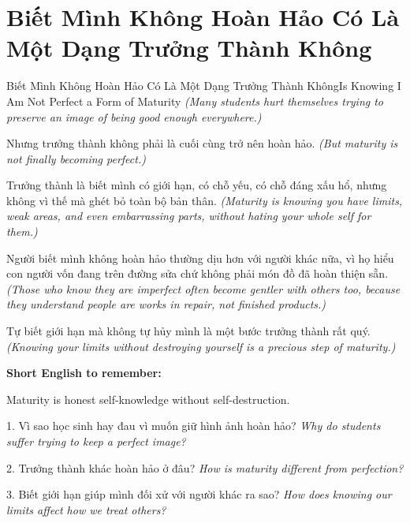 \section{Biết Mình Không Hoàn Hảo Có Là Một Dạng Trưởng Thành Không}
\begin{truyen}{Biết Mình Không Hoàn Hảo Có Là Một Dạng Trưởng Thành Không}{Is Knowing I Am Not Perfect a Form of Maturity}
\textit{(Many students hurt themselves trying to preserve an image of being good enough everywhere.)}

Nhưng trưởng thành không phải là cuối cùng trở nên hoàn hảo.
\textit{(But maturity is not finally becoming perfect.)}

Trưởng thành là biết mình có giới hạn, có chỗ yếu, có chỗ đáng xấu hổ, nhưng không vì thế mà ghét bỏ toàn bộ bản thân.
\textit{(Maturity is knowing you have limits, weak areas, and even embarrassing parts, without hating your whole self for them.)}

Người biết mình không hoàn hảo thường dịu hơn với người khác nữa, vì họ hiểu con người vốn đang trên đường sửa chứ không phải món đồ đã hoàn thiện sẵn.
\textit{(Those who know they are imperfect often become gentler with others too, because they understand people are works in repair, not finished products.)}
\end{truyen}

\begin{baihoc}
Tự biết giới hạn mà không tự hủy mình là một bước trưởng thành rất quý.
\textit{(Knowing your limits without destroying yourself is a precious step of maturity.)}
\end{baihoc}

\begin{ghinhoanh}
\textbf{Short English to remember:}

Maturity is honest self-knowledge without self-destruction.

\end{ghinhoanh}

\begin{tuhocnhanh}
1. Vì sao học sinh hay đau vì muốn giữ hình ảnh hoàn hảo? \textit{Why do students suffer trying to keep a perfect image?}

2. Trưởng thành khác hoàn hảo ở đâu? \textit{How is maturity different from perfection?}

3. Biết giới hạn giúp mình đối xử với người khác ra sao? \textit{How does knowing our limits affect how we treat others?}
\end{tuhocnhanh}
\ngancach

